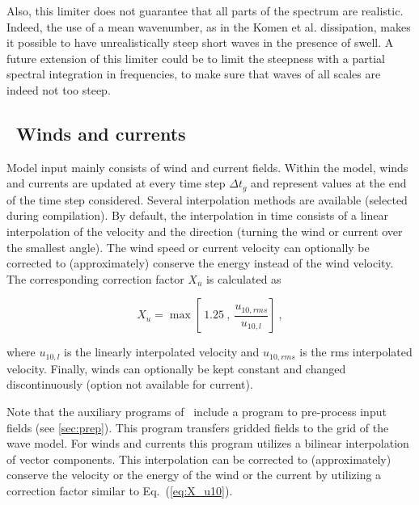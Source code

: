 Also, this limiter does not guarantee that all parts of the spectrum are realistic. Indeed, 
the use of a mean wavenumber, as in the Komen et al. dissipation, makes it possible to have unrealistically steep 
short waves in the presence of swell. A future extension of this limiter could be to limit the steepness with a partial spectral integration 
in frequencies, to make sure that waves of all scales are indeed not too steep. 


\pb
\vssub
\subsection{~Winds and currents}
\vssub

\noindent
Model input mainly consists of wind and current fields. Within the model,
winds and currents are updated at every time step $\Delta t_g$ and represent
values at the end of the time step considered. Several interpolation methods
are available (selected during compilation). By default, the interpolation in
time consists of a linear interpolation of the velocity and the direction
(turning the wind or current over the smallest angle). The wind speed or
current velocity can optionally be corrected to (approximately) conserve the
energy instead of the wind velocity. The corresponding correction factor $X_u$
is calculated as


\begin{equation}
X_u = \max \left [ \: 1.25 \: , \: \frac{u_{10,rms}}{u_{10,l}}
\right ] \: , \label{eq:X_u10} \end{equation}

\noindent
where $u_{10,l}$ is the linearly interpolated velocity and $u_{10,rms}$ is the
rms interpolated velocity. Finally, winds can optionally be kept constant and
changed discontinuously (option not available for current).

\vspace{\baselineskip} \noindent 
Note that the auxiliary programs of \ws\ include a program to pre-process
input fields (see \para\ref{sec:prep}). This program transfers gridded fields
to the grid of the wave model. For winds and currents this program utilizes a
bilinear interpolation of vector components. This interpolation can be
corrected to (approximately) conserve the velocity or the energy of the wind
or the current by utilizing a correction factor similar to
Eq.~(\ref{eq:X_u10}).


